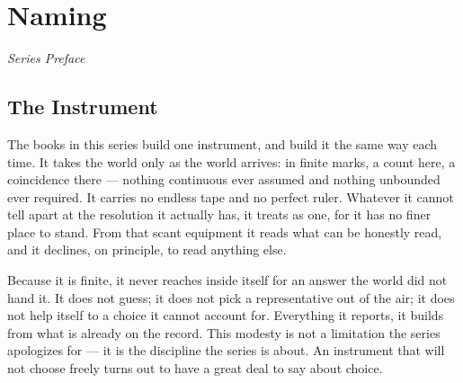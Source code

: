 
\chapter*{Naming}

\begin{center}\textit{Series Preface}\end{center}

\bigskip

\section*{The Instrument}

The books in this series build one instrument, and build it the same way each time. It takes the world only as
the world arrives: in finite marks, a count here, a coincidence there --- nothing continuous ever assumed and
nothing unbounded ever required. It carries no endless tape and no perfect ruler. Whatever it cannot tell apart
at the resolution it actually has, it treats as one, for it has no finer place to stand. From that scant
equipment it reads what can be honestly read, and it declines, on principle, to read anything else.

Because it is finite, it never reaches inside itself for an answer the world did not hand it. It does not guess;
it does not pick a representative out of the air; it does not help itself to a choice it cannot account for.
Everything it reports, it builds from what is already on the record. This modesty is not a limitation the series
apologizes for --- it is the discipline the series is about. An instrument that will not choose freely turns out
to have a great deal to say about choice.

